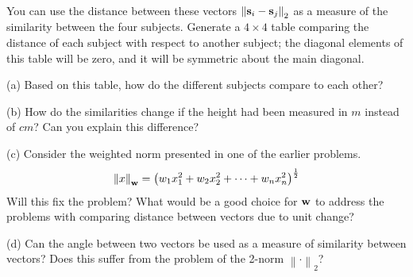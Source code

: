 \begin{enumerate}
    You can use the distance between these vectors $\left\lVert \mathbf{s}_i - \mathbf{s}_j\right\rVert_2$ as a measure of the similarity between the four subjects. Generate a $4 \times 4$ table comparing the distance of each subject with respect to another subject; the diagonal elements of this table will be zero, and it will be symmetric about the main diagonal. 

    (a) Based on this table, how do the different subjects compare to each other?

    (b) How do the similarities change if the height had been measured in $m$ instead of $cm$? Can you explain this difference?

    (c) Consider the weighted norm presented in one of the earlier problems.  
    \[ \left\lVert x \right\rVert_\mathbf{w} = \left(w_1 x_1^2 + w_2 x_2^2 + \cdots + w_n x_n^2\right)^{\frac{1}{2}} \]
    Will this fix the problem? What would be a good choice for $\mathbf{w}$ to address the problems with comparing distance between vectors due to unit change?

    (d) Can the angle between two vectors be used as a measure of similarity between vectors? Does this suffer from the problem of the 2-norm $\left\lVert \cdot \right\rVert_2$?
\end{enumerate}



